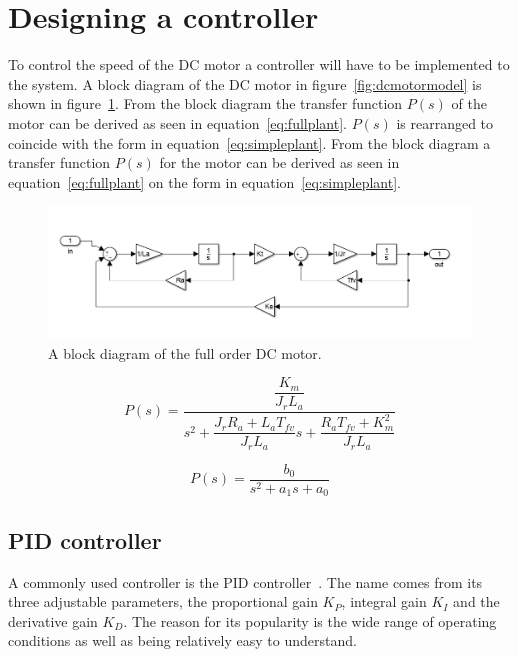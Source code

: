 \section{Designing a controller}
\label{sec:controller}

To control the speed of the DC motor a controller will have to be implemented to the system. A block diagram of the DC motor in figure~\ref{fig:dcmotormodel} is shown in figure~\ref{fig:dcblock}. From the block diagram the transfer function $P(s)$ of the motor can be derived as seen in equation~\ref{eq:fullplant}. $P(s)$ is rearranged to coincide with the form in equation~\ref{eq:simpleplant}. From the block diagram a transfer function $P(s)$ for the motor can be derived as seen in equation~\ref{eq:fullplant} on the form in equation~\ref{eq:simpleplant}.

\begin{figure}[!h]
	\centering
	\includegraphics[width=1\linewidth]{graphics/dcblockdiagram}
	\caption{A block diagram of the full order DC motor.}
	\label{fig:dcblock}
\end{figure}


\begin{equation}
\label{eq:fullplant}
P(s) = \dfrac{\dfrac{K_m}{J_r L_a}}{s^2 + \dfrac{J_r R_a + L_a T_{fv}}{J_r L_a}s + \dfrac{R_a T_{fv} +K_m^2}{J_r L_a}}
\end{equation}

\begin{equation}
\label{eq:simpleplant}
P(s) = \dfrac{b_0}{s^2 + a_1 s + a_0}
\end{equation}


\subsection{PID controller}
 A commonly used controller is the PID controller~\cite{feedback}. 
 The name comes from its three adjustable parameters, the proportional gain $K_{P}$, integral gain $K_{I}$ and the derivative gain $K_{D}$. 
 The reason for its popularity is the wide range of operating conditions as well as being relatively easy to understand. 
 
